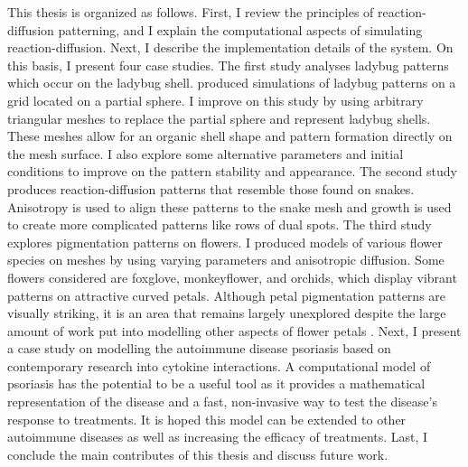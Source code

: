 
This thesis is organized as follows. First, I review the principles of reaction-diffusion patterning, and I explain the computational aspects of simulating reaction-diffusion. Next, I describe the implementation details of the \ProgramName{} system. On this basis, I present four case studies. The first study analyses ladybug patterns which occur on the ladybug shell. \citep{liaw2001} produced simulations of ladybug patterns on a grid located on a partial sphere. I improve on this study by using arbitrary triangular meshes to replace the partial sphere and represent ladybug shells. These meshes allow for an organic shell shape and pattern formation directly on the mesh surface. I also explore some alternative parameters and initial conditions to improve on the pattern stability and appearance. The second study produces reaction-diffusion patterns that resemble those found on snakes. Anisotropy is used to align these patterns to the snake mesh and growth is used to create more complicated patterns like rows of dual spots. The third study explores pigmentation patterns on flowers. I produced models of various flower species on meshes by using varying parameters and anisotropic diffusion. Some flowers considered are foxglove, monkeyflower, and orchids, which display vibrant patterns on attractive curved petals. Although petal pigmentation patterns are visually striking, it is an area that remains largely unexplored despite the large amount of work put into modelling other aspects of flower petals \citep{owens2016}. Next, I present a case study on modelling the autoimmune disease psoriasis based on contemporary research into cytokine interactions. A computational model of psoriasis has the potential to be a useful tool as it provides a mathematical representation of the disease and a fast, non-invasive way to test the disease's response to treatments. It is hoped this model can be extended to other autoimmune diseases as well as increasing the efficacy of treatments. Last, I conclude the main contributes of this thesis and discuss future work.


